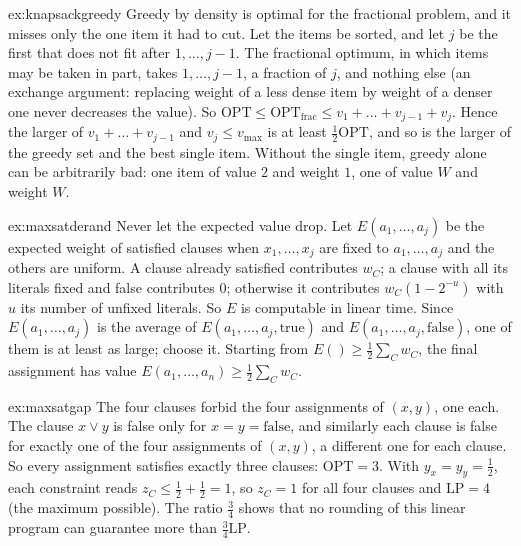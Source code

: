 \begin{solution}{ex:knapsackgreedy}
\idea Greedy by density is optimal for the fractional problem, and it misses only the one item it had to cut.
\writeup Let the items be sorted, and let $j$ be the first that does not fit after $1,\dots,j-1$. The fractional optimum, in which items may be taken in part, takes $1,\dots,j-1$, a fraction of $j$, and nothing else (an exchange argument: replacing weight of a less dense item by weight of a denser one never decreases the value). So $\mathrm{OPT}\le\mathrm{OPT}_{\mathrm{frac}}\le v_1+\dots+v_{j-1}+v_j$.
Hence the larger of $v_1+\dots+v_{j-1}$ and $v_j\le v_{\max}$ is at least $\frac12\mathrm{OPT}$, and so is the larger of the greedy set and the best single item. Without the single item, greedy alone can be arbitrarily bad: one item of value $2$ and weight $1$, one of value $W$ and weight $W$.
\end{solution}

\begin{solution}{ex:maxsatderand}
\idea Never let the expected value drop.
\writeup Let $E(a_1,\dots,a_j)$ be the expected weight of satisfied clauses when $x_1,\dots,x_j$ are fixed to $a_1,\dots,a_j$ and the others are uniform. A clause already satisfied contributes $w_C$; a clause with all its literals fixed and false contributes $0$; otherwise it contributes $w_C(1-2^{-u})$ with $u$ its number of unfixed literals. So $E$ is computable in linear time. Since $E(a_1,\dots,a_j)$ is the average of $E(a_1,\dots,a_j,\mathrm{true})$ and $E(a_1,\dots,a_j,\mathrm{false})$, one of them is at least as large; choose it. Starting from $E()\ge\frac12\sum_Cw_C$, the final assignment has value $E(a_1,\dots,a_n)\ge\frac12\sum_Cw_C$.
\end{solution}

\begin{solution}{ex:maxsatgap}
\idea The four clauses forbid the four assignments of $(x,y)$, one each.
\writeup The clause $x\vee y$ is false only for $x=y=\mathrm{false}$, and similarly each clause is false for exactly one of the four assignments of $(x,y)$, a different one for each clause. So every assignment satisfies exactly three clauses: $\mathrm{OPT}=3$. With $y_x=y_y=\frac12$, each constraint reads $z_C\le\frac12+\frac12=1$, so $z_C=1$ for all four clauses and $\mathrm{LP}=4$ (the maximum possible). The ratio $\frac34$ shows that no rounding of this linear program can guarantee more than $\frac34\mathrm{LP}$.
\end{solution}

